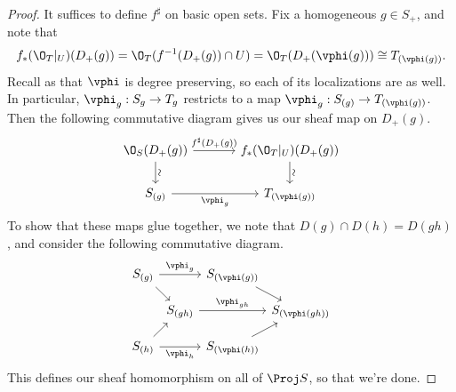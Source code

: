 \documentclass[12pt]{amsart}
\begin{document}
\begin{proof}
  It suffices to define $f^\sharp$ on basic open sets.
  Fix a homogeneous $g\in S_+$, and note that 
  \[
    f_*(\O_T|_U)(D_+(g)) = \O_T(f^{-1}(D_+(g))\cap U) = \O_T(D_+(\vphi(g)))\cong T_{(\vphi(g))}.
  \]
  Recall as that $\vphi$ is degree preserving, so each of its localizations are as well.
  In particular, $\vphi_g:S_g\to T_g$ restricts to a map $\vphi_g:S_{(g)}\to T_{(\vphi(g))}$.
  Then the following commutative diagram gives us our sheaf map on $D_+(g)$.
  \[
    \begin{tikzcd}[column sep = 1.2cm]
      \O_S(D_+(g))\ar[d, "\sim" {rotate=90, anchor=north}]\ar[r,"f^\sharp(D_+(g))"]
      &f_*(\O_T|_U)(D_+(g))\ar[d, "\sim" {rotate=90, anchor=north}] \\
      S_{(g)}\ar[r,"\vphi_g"']&T_{(\vphi(g))}
    \end{tikzcd}
  \] 
  To show that these maps glue together, we note that $D(g)\cap D(h)= D(gh)$, and consider the following commutative diagram.
  \[
    \begin{tikzcd}[column sep = 0.05cm,row sep = 0.4cm]
      S_{(g)}\ar[rr,"\vphi_g"]\ar[dr]
        &&S_{(\vphi(g))}\ar[dr]\\
      &S_{(gh)}\ar[rr,"\vphi_{gh}"] 
        &&S_{(\vphi(gh))} \\
      S_{(h)}\ar[ur]\ar[rr,"\vphi_h"']
        &&S_{(\vphi(h))}\ar[ur]
    \end{tikzcd}
  \] 
  This defines our sheaf homomorphism on all of $\Proj S$, so that we're done.




\end{proof}
\end{document}
